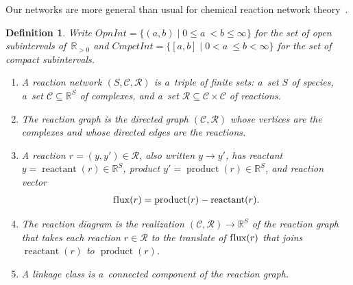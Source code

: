 \documentclass[pdftex]{sigma}
\newtheorem{Definition}[Theorem]{Definition}
\newcommand{\source}[1]{\operatorname{reactant}(#1)}
\newcommand{\target}[1]{\operatorname{product}(#1)} %
\newcommand{\flux}[1]{\operatorname{f\/lux}(#1)} %
\begin{document}
Our networks are more general than usual for chemical reaction network  theory~\cite{Fein79,HornJackson}.
\begin{Definition}
\label{def:crn}
Write $\mathit{OpnInt}=\big\{(a,b)\mid0\leq a~<b\leq\infty\big\}$ for the set of open subintervals of~$\mathbb{R}_{>0}$
and $\mathit{CmpctInt}=\big\{[a,b]\mid0<a~\leq b<\infty\big\}$ for the set of compact subintervals.
\begin{enumerate}\itemsep=0pt
\item A \emph{reaction network} $(S,\mathcal C,\mathcal R)$ is a~triple of f\/inite sets: a~set $S$ of \emph{species},
a~set $\mathcal C\subseteq\mathbb{R}^{S}$ of \emph{complexes}, and a~set $\mathcal R\subseteq\mathcal C\times\mathcal
C$ of \emph{reactions}.
\item The \emph{reaction graph} is the directed graph $(\mathcal C,\mathcal R)$ whose vertices are the complexes and
whose directed edges are the reactions.
\item A reaction $r=(y,y')\in\mathcal R$, also written $y\to y'$, has \emph{reactant}
$y=\operatorname{reactant}(r)\in\mathbb{R}^S$,
\emph{product} $y'=\target{r}\in\mathbb{R}^S$, and \emph{reaction vector}
\begin{gather*}
\flux{r}={\target{r}-\source{r}}.
\end{gather*}
\item The \emph{reaction diagram} is the realization $(\mathcal C,\mathcal R)\to\mathbb{R}^S$ of the reaction graph
that takes each reaction $r\in\mathcal R$ to the translate of $\flux r$ that joins $\source r$ to $\target r$.
\item A \emph{linkage class} is a~connected component of the reaction graph.
\end{enumerate}
\end{Definition}
\end{document}
